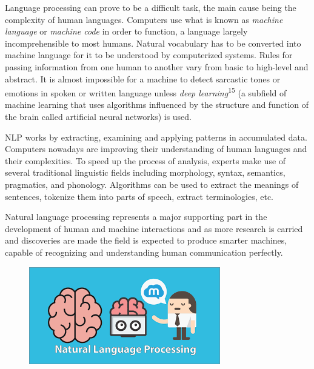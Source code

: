 \documentclass{report}
\begin{document}
Language processing can prove to be a difficult task, the main cause being the complexity of human languages. Computers use what is known as \textit{machine language} or \textit{machine code} in order to function, a language largely incomprehensible to most humans. Natural vocabulary has to be converted into machine language for it to be understood by computerized systems. Rules for passing information from one human to another vary from basic to high-level and abstract. It is almost impossible for a machine to detect sarcastic tones or emotions in spoken or written language unless \textit{deep learning}\textsuperscript{15} (a subfield of machine learning that uses algorithms influenced by the structure and function of the brain called artificial neural networks) is used. \par

NLP works by extracting, examining and applying patterns in accumulated data. Computers nowadays are improving their understanding of human languages and their complexities. To speed up the process of analysis, experts make use of several traditional linguistic fields including morphology, syntax, semantics, pragmatics, and phonology. Algorithms can be used to extract the meanings of sentences, tokenize them into parts of speech, extract terminologies, etc. \par

Natural language processing represents a major supporting part in the development of human and machine interactions and as more research is carried and discoveries are made the field is expected to produce smarter machines, capable of recognizing and understanding human communication perfectly.
\begin{figure}[h]
\vspace{2cm}
\centerline{\includegraphics[scale=0.8]{nlp2}}
\end{figure}
\end{document}
